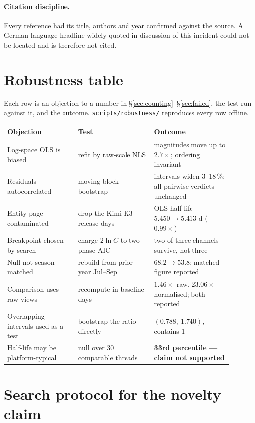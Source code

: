 \documentclass[11pt,a4paper]{article}
\begin{document}
\paragraph{Citation discipline.} Every reference had its title, authors and year
confirmed against the source. A German-language headline widely quoted in
discussion of this incident could not be located and is therefore not cited.

\section{Robustness table}
\label{sec:robust-table}

Each row is an objection to a number in §\ref{sec:counting}--§\ref{sec:failed},
the test run against it, and the outcome. \texttt{scripts/robustness/} reproduces
every row offline.

\begin{center}
\small
\begin{tabular}{p{0.29\linewidth}p{0.30\linewidth}p{0.31\linewidth}}
\toprule
Objection & Test & Outcome \\\midrule
Log-space OLS is biased \cite{clauset2009powerlaw} & refit by raw-scale NLS & magnitudes move up to $2.7\times$; ordering invariant \\
Residuals autocorrelated & moving-block bootstrap & intervals widen 3--18\,\%; all pairwise verdicts unchanged \\
Entity page contaminated & drop the Kimi-K3 release days & OLS half-life $5.450 \to 5.413$ d ($0.99\times$) \\
Breakpoint chosen by search & charge $2\ln C$ to two-phase AIC & two of three channels survive, not three \\
Null not season-matched & rebuild from prior-year Jul--Sep & $68.2 \to \mathbf{53.8}$; matched figure reported \\
Comparison uses raw views & recompute in baseline-days & $1.46\times$ raw, $\mathbf{23.06\times}$ normalised; both reported \\
Overlapping intervals used as a test & bootstrap the ratio directly & $(0.788,\ 1.740)$, contains 1 \\
Half-life may be platform-typical & null over 30 comparable threads & \textbf{33rd percentile --- claim not supported} \\
\bottomrule
\end{tabular}
\end{center}

\section{Search protocol for the novelty claim}
\label{sec:searchprotocol}
\end{document}
